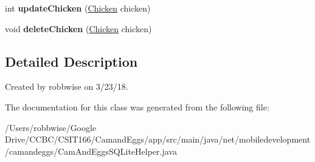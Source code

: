 \begin{DoxyCompactItemize}
\item 
\mbox{\label{classnet_1_1mobiledevelopment_1_1camandeggs_1_1_cam_and_eggs_s_q_lite_helper_a2c719648254dd1e4471545ea356d32fd}} 
int {\bfseries update\+Chicken} (\hyperlink{classnet_1_1mobiledevelopment_1_1camandeggs_1_1_chicken}{Chicken} chicken)
\item 
\mbox{\label{classnet_1_1mobiledevelopment_1_1camandeggs_1_1_cam_and_eggs_s_q_lite_helper_abfdf570911ef701c2005ca8a3a865dd3}} 
void {\bfseries delete\+Chicken} (\hyperlink{classnet_1_1mobiledevelopment_1_1camandeggs_1_1_chicken}{Chicken} chicken)
\end{DoxyCompactItemize}


\subsection{Detailed Description}
Created by robbwise on 3/23/18. 

The documentation for this class was generated from the following file\+:\begin{DoxyCompactItemize}
\item 
/\+Users/robbwise/\+Google Drive/\+C\+C\+B\+C/\+C\+S\+I\+T166/\+Camand\+Eggs/app/src/main/java/net/mobiledevelopment/camandeggs/Cam\+And\+Eggs\+S\+Q\+Lite\+Helper.\+java\end{DoxyCompactItemize}
